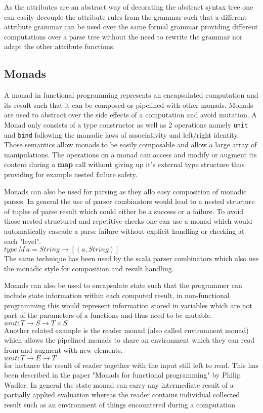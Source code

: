 As the attributes are an abstract way of decorating the abstract syntax tree one can easily decouple the attribute rules from the grammar such that a different attribute grammar can be used over the same formal grammar providing different computations over a parse tree without the need to rewrite the grammar nor adapt the other attribute functions.

\subsection{Monads}
A monad in functional programming represents an encapsulated computation and its result such that it can be composed or pipelined with other monads. Monads are used to abstract over the side effects of a computation and avoid mutation. A Monad only consists of a type constructor as well as 2 operations namely \verb/unit/ and \verb/bind/ following the monadic laws of associativity and left/right identity. Those semantics allow monads to be easily composable and allow a large array of manipulations. The operations on a monad can access and modify or augment its content during a \textbf{map} call without giving up it's external type structure thus providing for example nested failure safety.
 
Monads can also be used for parsing as they allo easy composition of monadic parses. In general the use of parser combinators would lead to a nested structure of tuples of parse result which could either be a success or a failure. To avoid those nested structured and repetitive checks one can use a monad which would automatically cascade a parse failure without explicit handling or checking at each "level".\\
$type\, M\, a = String \rightarrow [(a, String)]$\\
The same technique has been used by the scala parser combinators which also use the monadic style for composition and result handling.

Monads can also be used to encapsulate state such that the programmer can include state information within each computed result, in non-functional programming this would represent information stored in variables which are not part of the parameters of a functions and thus need to be mutable.\\
$unit: T \rightarrow S \rightarrow T \times S $\\
Another related example is the reader monad (also called environment monad) which allows the pipelined monads to share an environment which they can read from and augment with new elements.\\
$unit: T \rightarrow E \rightarrow T $\\
for instance the result of reader together with the input still left to read. This has been described in the paper "Monads for functional programming"\cite{monads} by Philip Wadler. In general the state monad can carry any intermediate result of a partially applied evaluation whereas the reader contains individual collected result such as an environment of things encountered during a computation

